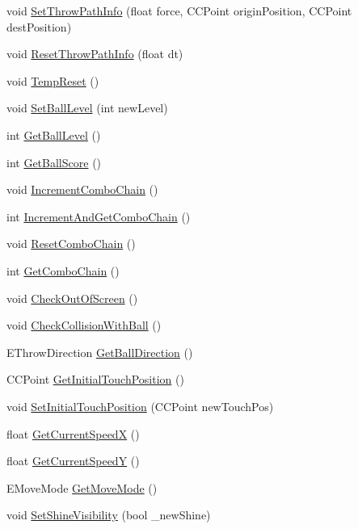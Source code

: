\begin{DoxyCompactItemize}
\item 
void \hyperlink{class_j_g___ball_aab04571018509cc90311c1cc9c270d4b}{Set\-Throw\-Path\-Info} (float force, C\-C\-Point origin\-Position, C\-C\-Point dest\-Position)
\item 
void \hyperlink{class_j_g___ball_aef3a643ab6a6677daa749b3324d058f1}{Reset\-Throw\-Path\-Info} (float dt)
\item 
void \hyperlink{class_j_g___ball_aa8072c40481b1552bc532ef315e631db}{Temp\-Reset} ()
\item 
void \hyperlink{class_j_g___ball_ac67d3c45ca500fc84f984c77693d50b1}{Set\-Ball\-Level} (int new\-Level)
\item 
int \hyperlink{class_j_g___ball_a3837d8b56dcc3f4251a5e5498e93a58a}{Get\-Ball\-Level} ()
\item 
int \hyperlink{class_j_g___ball_a421b0c32f767c87d28f48b4f3300bb27}{Get\-Ball\-Score} ()
\item 
void \hyperlink{class_j_g___ball_a742f134c0a054ed2ed396fc92df96d62}{Increment\-Combo\-Chain} ()
\item 
int \hyperlink{class_j_g___ball_a750a38e2daca94faf663497d7517d42d}{Increment\-And\-Get\-Combo\-Chain} ()
\item 
void \hyperlink{class_j_g___ball_a8c145a36d87265a9de6a9e5e609b6e4e}{Reset\-Combo\-Chain} ()
\item 
int \hyperlink{class_j_g___ball_a7fa1840bb6a014a4871dc1d2fde5886f}{Get\-Combo\-Chain} ()
\item 
void \hyperlink{class_j_g___ball_a9438103f51be5ccce4c9d7e85aca3804}{Check\-Out\-Of\-Screen} ()
\item 
void \hyperlink{class_j_g___ball_aa6a59ff90c965a0bb99333b83bb0f7b6}{Check\-Collision\-With\-Ball} ()
\item 
E\-Throw\-Direction \hyperlink{class_j_g___ball_a94843b91ab6f8cddbb2b90de6daeb531}{Get\-Ball\-Direction} ()
\item 
C\-C\-Point \hyperlink{class_j_g___ball_a0ad42506b43718f14ccb45f163d92999}{Get\-Initial\-Touch\-Position} ()
\item 
void \hyperlink{class_j_g___ball_a628e6f457315f1af9d9638834dff91e0}{Set\-Initial\-Touch\-Position} (C\-C\-Point new\-Touch\-Pos)
\item 
float \hyperlink{class_j_g___ball_af4db51a3f9dc76e7d811929b52ad3f36}{Get\-Current\-Speed\-X} ()
\item 
float \hyperlink{class_j_g___ball_a2fbc3522176f40267110d6072dc42d13}{Get\-Current\-Speed\-Y} ()
\item 
E\-Move\-Mode \hyperlink{class_j_g___ball_a3913cb7972086e1ee9b97434d1af81e1}{Get\-Move\-Mode} ()
\item 
void \hyperlink{class_j_g___ball_a562155f1d0c2d01485b83104e8de77c1}{Set\-Shine\-Visibility} (bool \-\_\-new\-Shine)
\end{DoxyCompactItemize}

